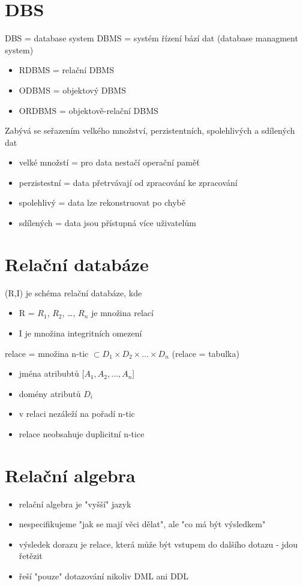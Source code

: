\documentclass{szzclass}
\begin{document}
\tableofcontents
\newpage

\section{DBS}
DBS = database system \newline
DBMS = systém řízení bází dat (database managment system)
\begin{itemize}
  \item RDBMS = relační DBMS
  \item ODBMS = objektový DBMS
  \item ORDBMS = objektově-relační DBMS
\end{itemize}

Zabývá se seřazením velkého množství, perzistentních, spolehlivých a sdílených dat
\begin{itemize}
  \item velké množstí = pro data nestačí operační paměť
  \item perzistestní = data přetrvávají od zpracování ke zpracování
  \item spolehlivý = data lze rekonstruovat po chybě
  \item sdílených = data jsou přístupná více uživatelům
\end{itemize}
\section{Relační databáze}
(R,I) je schéma relační databáze, kde
\begin{itemize}
  \item R = {$R_1$, $R_2$, \dots, $R_n$} je množina relací
  \item I je množina integritních omezení
\end{itemize}

relace = množina n-tic $\subset D_1 \times D_2 \times \dots \times D_n$ (relace = tabulka)
\begin{itemize}
  \item jména atribubtů [$A_1, A_2, \dots, A_n$]
  \item domény atributů $D_i$
  \item v relaci nezáleží na pořadí n-tic
  \item relace neobsahuje duplicitní n-tice
\end{itemize}
\section{Relační algebra}
\begin{itemize}
  \item relační algebra je "vyšší" jazyk
  \item nespecifikujeme "jak se mají věci dělat", ale "co má být výsledkem"
  \item výsledek dorazu je relace, která může být vstupem do dalšího dotazu - jdou řetězit
  \item řeší "pouze" dotazování nikoliv DML ani DDL
\end{itemize}
\end{document}
